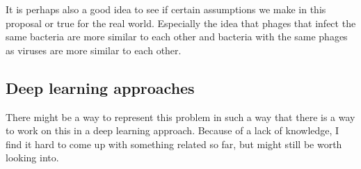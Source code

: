 \documentclass{article}
\begin{document}
It is perhaps also a good idea to see if certain assumptions we make in 
this proposal or true for the real world. 
Especially the idea that phages that infect the same
bacteria are more similar to each other and bacteria with the same phages
as viruses are more similar to each other.

\subsection{Deep learning approaches}

There might be a way to represent this problem in such a way that there is a 
way to work on this in a deep learning approach. Because of a lack of knowledge, 
I find it hard to come up with something related so far, but might still
be worth looking into.

\printbibliography{}
\end{document}
